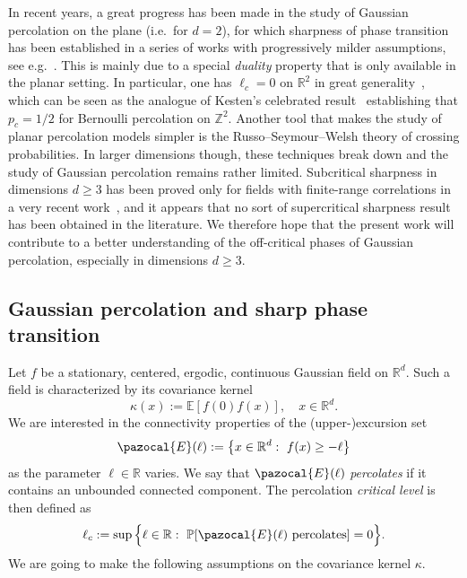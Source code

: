 \documentclass[AHL,Unicode,longabstracts,published]{cedram}
\renewcommand{\P}{\mathbb{P}}
\newcommand{\E}{\mathbb{E}}
\newcommand{\R}{\mathbb{R}}
\newcommand{\Z}{\mathbb{Z}}
\newcommand{\R}{\mathbb{R}}
\newcommand{\Z}{\mathbb{Z}}
\begin{document}
In recent years, a great progress has been made in the study of Gaussian percolation on the plane (i.e.~for $d=2$), for which sharpness of phase transition has been established in a series of works with progressively milder assumptions, see e.g.~\cite{Riv19,RVb,MRV20,MV}. This is mainly due to a special \emph{duality} property that is only available in the planar setting. In particular, one has $\ell_c=0$ on $\R^2$ in great generality~\cite{MRV20}, which can be seen as the analogue of Kesten's celebrated result~\cite{Kes80} establishing that $p_c=1/2$ for Bernoulli percolation on $\Z^2$. Another tool that makes the study of planar percolation models simpler is the Russo--Seymour--Welsh theory of crossing probabilities. In larger dimensions though, these techniques break down and the study of Gaussian percolation remains rather limited. Subcritical sharpness in dimensions $d\geq3$ has been proved only for fields with finite-range correlations in a very recent work~\cite{DM21}, and it appears that no sort of supercritical sharpness result has been obtained in the literature. We therefore hope that the present work will contribute to a better understanding of the off-critical phases of Gaussian percolation, especially in dimensions $d\geq3$.


\subsection{Gaussian percolation and sharp phase transition}

Let $f$ be a stationary, centered, ergodic, continuous Gaussian field on $\R^d$. Such a field is characterized by its covariance kernel
\begin{equation}
\kappa(x):=\E\left[f(0)f(x)\right],\quad x\in\R^d.
\end{equation}
We are interested in the connectivity properties of the (upper-)excursion set
\begin{equation}
\pazocal{E}(\ell):=\left\{x\in\R^d:~f(x)\geq -\ell\right\}
\end{equation}
as the parameter $\ell\in \R$ varies. We say that $\pazocal{E}(\ell)$ \emph{percolates} if it contains an unbounded connected component. The percolation \emph{critical level} is then defined as
\begin{equation}\label{eq:l_c_def}
\ell_c:=\sup\Big\{\ell\in \R:~\P[\pazocal{E}(\ell) \text{ percolates}]=0\Big\}.
\end{equation}
We are going to make the following assumptions on the covariance kernel $\kappa$.
\end{document}
